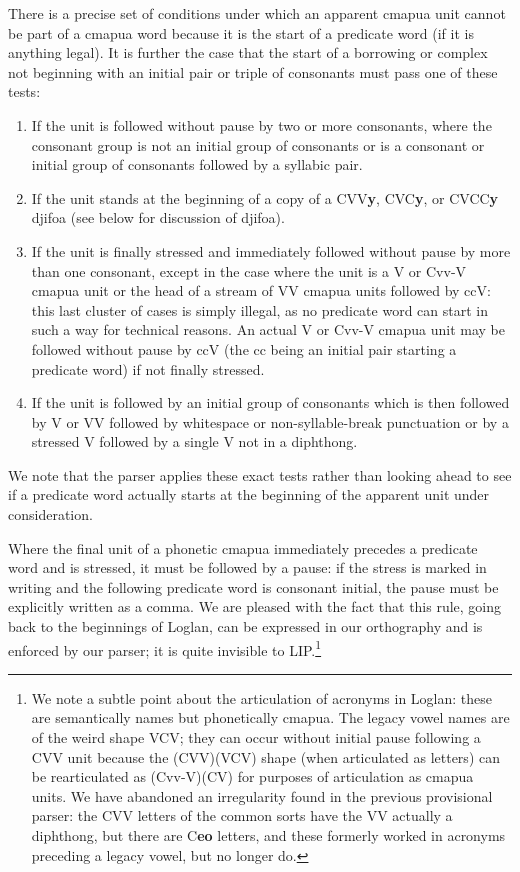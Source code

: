 \documentclass[12pt]{book}
\begin{document}
There is a precise set of conditions under which an apparent cmapua unit cannot be part of a cmapua word because it is the start of a predicate word
(if it is anything legal).  It is further the case that the start of a borrowing or complex not beginning with an initial pair or triple of consonants must pass one of these tests:

\begin{enumerate}

\item  If the unit is followed without pause by two or more consonants, where the consonant group is not an initial group of consonants or is a consonant or initial group of consonants followed by a syllabic pair.

\item  If the unit stands at the beginning of a copy of a CVV{\bf y}, CVC{\bf y}, or CVCC{\bf y} djifoa (see below for discussion of djifoa).

\item  If the unit is finally stressed and immediately followed without pause by more than one consonant, except in the case where the 
unit is a V or Cvv-V cmapua unit or the head of a stream of VV cmapua units followed by ccV:  this last cluster of cases is simply illegal, as no predicate word can start in such a way for technical reasons.  An actual V or Cvv-V cmapua unit may be followed without pause by ccV (the cc being an initial pair starting a predicate word) if not finally stressed. 

\item  If the unit is followed by an initial group of consonants which is then followed by V or VV followed by whitespace or non-syllable-break punctuation
or by a stressed V followed by a single V not in a diphthong.

\end{enumerate}

 We note that the parser applies these exact tests
rather than looking ahead to see if a predicate word actually starts at the beginning of the apparent unit under consideration.

Where the final unit of a phonetic cmapua immediately precedes a predicate word and is stressed, it must be followed by a pause:  if the stress is marked in writing and the following predicate word is consonant initial, the pause must be explicitly written as a comma.  We are pleased with the fact that this rule, going back to the beginnings of Loglan, can be expressed in our orthography and is enforced by our parser;  it is quite invisible to LIP.\footnote{We note a subtle point about the articulation of acronyms in Loglan:  these are semantically names but phonetically cmapua.  The legacy vowel names are of the weird shape VCV;  they can occur without initial pause
following a CVV unit because the (CVV)(VCV) shape (when articulated as letters) can be rearticulated as (Cvv-V)(CV) for purposes of articulation as cmapua units.  We have abandoned an irregularity found in the previous provisional parser:   the CVV letters of the common sorts have the VV actually a diphthong, but there are C{\bf eo} letters, and these formerly worked in acronyms preceding a legacy vowel, but no longer do.}
\end{document}
